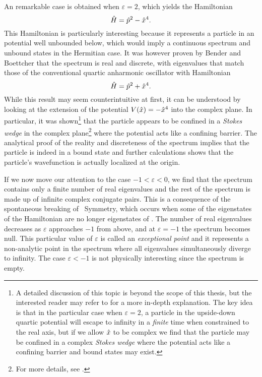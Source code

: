             An remarkable case is obtained when $\varepsilon = 2$, which yields the Hamiltonian
            \begin{equation}
                \hat{H} = \hat{p}^2 - \hat{x}^4
                \text{.}
            \end{equation}
            This Hamiltonian is particularly interesting because it represents a particle in an potential well unbounded below, which would imply a continuous spectrum and unbound states in the Hermitian case. It was however proven by Bender and Boettcher \cite{Bender1998} that the spectrum is real and discrete, with eigenvalues that match those of the conventional quartic anharmonic oscillator with Hamiltonian
            \begin{equation}
                \hat{H} = \hat{p}^2 + \hat{x}^4
                \text{.}
            \end{equation}
            While this result may seem counterintuitive at first, it can be understood by looking at the extension of the potential $V\pqty{\hx} = -\hx^4$ into the complex plane. In particular, it was shown\footnote{A detailed discussion of this topic is beyond the scope of this thesis, but the interested reader may refer to \cite{Bender1998,bender2024} for a more in-depth explanation. The key idea is that in the particular case when $\varepsilon = 2$, a particle in the upside-down quartic potential will escape to infinity in a \emph{finite} time when constrained to the real axis, but if we allow $\hat{x}$ to be complex we find that the particle may be confined in a complex \emph{Stokes wedge} where the potential acts like a confining barrier and bound states may exist.} that the particle appears to be confined in a \emph{Stokes wedge} in the complex plane\footnote{For more details, see .} where the potential acts like a confining barrier. The analytical proof of the reality and discreteness of the spectrum implies that the particle is indeed in a bound state and further calculations shows that the particle's wavefunction is actually localized at the origin.

            If we now move our attention to the case $-1 < \varepsilon < 0$, we find that the spectrum contains only a finite number of real eigenvalues and the rest of the spectrum is made up of infinite complex conjugate pairs. This is a consequence of the spontaneous breaking of \PT\ Symmetry, which occurs when some of the eigenstates of the Hamiltonian are no longer eigenstates of \hPT. The number of real eigenvalues decreases as $\varepsilon$ approaches $-1$ from above, and at $\varepsilon = -1$ the spectrum becomes null. This particular value of $\varepsilon$ is called an \emph{exceptional point} and it represents a non-analytic point in the spectrum where all eigenvalues simultaneously diverge to infinity. The case $\varepsilon < -1$ is not physically interesting since the spectrum is empty.